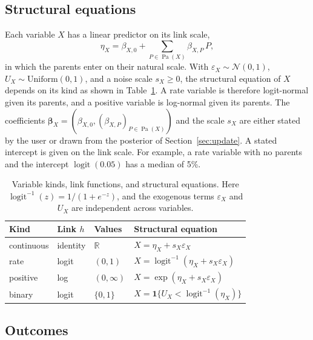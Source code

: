 \documentclass[12pt]{article}
\DeclareMathOperator{\logit}{logit}
\DeclareMathOperator{\Pa}{Pa}
\newcommand{\expit}{\logit^{-1}}
\theoremstyle{plain}
\theoremstyle{definition}
\begin{document}
\subsection{Structural equations}\label{sec:equations}

Each variable $X$ has a linear predictor on its link scale,
\begin{equation}\label{eq:linpred}
    \eta_X=\beta_{X,0}+\sum_{P\in\Pa(X)}\beta_{X,P}\,P ,
\end{equation}
in which the parents enter on their natural scale. With $\varepsilon_X\sim\mathcal{N}(0,1)$, $U_X\sim\mathrm{Uniform}(0,1)$, and a noise scale $s_X\geq 0$, the structural equation of $X$ depends on its kind as shown in Table~\ref{tab:kinds}. A rate variable is therefore logit-normal given its parents, and a positive variable is log-normal given its parents. The coefficients $\boldsymbol\beta_X=(\beta_{X,0},(\beta_{X,P})_{P\in\Pa(X)})$ and the scale $s_X$ are either stated by the user or drawn from the posterior of Section~\ref{sec:update}. A stated intercept is given on the link scale. For example, a rate variable with no parents and the intercept $\logit(0.05)$ has a median of 5\%.

\begin{table}[htbp]
\centering
\small
\begin{tabular}{llll}
\toprule
Kind & Link $h$ & Values & Structural equation \\
\midrule
continuous & identity & $\mathbb{R}$ & $X=\eta_X+s_X\varepsilon_X$ \\
rate & logit & $(0,1)$ & $X=\expit(\eta_X+s_X\varepsilon_X)$ \\
positive & log & $(0,\infty)$ & $X=\exp(\eta_X+s_X\varepsilon_X)$ \\
binary & logit & $\{0,1\}$ & $X=\mathbf{1}\{U_X<\expit(\eta_X)\}$ \\
\bottomrule
\end{tabular}
\caption{Variable kinds, link functions, and structural equations. Here $\expit(z)=1/(1+e^{-z})$, and the exogenous terms $\varepsilon_X$ and $U_X$ are independent across variables.}
\label{tab:kinds}
\end{table}

\subsection{Outcomes}\label{sec:outcomes}
\end{document}
